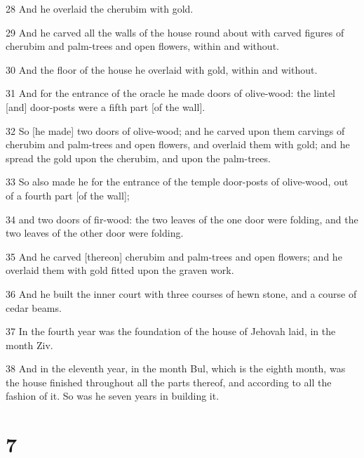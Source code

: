 \par 28 And he overlaid the cherubim with gold.
\par 29 And he carved all the walls of the house round about with carved figures of cherubim and palm-trees and open flowers, within and without.
\par 30 And the floor of the house he overlaid with gold, within and without.
\par 31 And for the entrance of the oracle he made doors of olive-wood: the lintel [and] door-posts were a fifth part [of the wall].
\par 32 So [he made] two doors of olive-wood; and he carved upon them carvings of cherubim and palm-trees and open flowers, and overlaid them with gold; and he spread the gold upon the cherubim, and upon the palm-trees.
\par 33 So also made he for the entrance of the temple door-posts of olive-wood, out of a fourth part [of the wall];
\par 34 and two doors of fir-wood: the two leaves of the one door were folding, and the two leaves of the other door were folding.
\par 35 And he carved [thereon] cherubim and palm-trees and open flowers; and he overlaid them with gold fitted upon the graven work.
\par 36 And he built the inner court with three courses of hewn stone, and a course of cedar beams.
\par 37 In the fourth year was the foundation of the house of Jehovah laid, in the month Ziv.
\par 38 And in the eleventh year, in the month Bul, which is the eighth month, was the house finished throughout all the parts thereof, and according to all the fashion of it. So was he seven years in building it.

\chapter{7}

